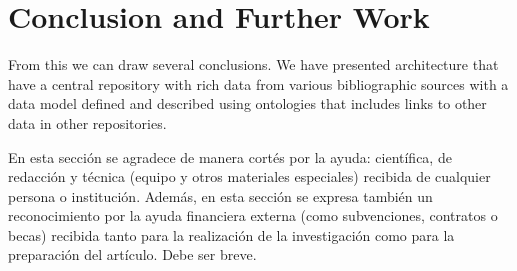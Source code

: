 \documentclass[11pt]{article}
\begin{document}
\section{Conclusion and Further Work}
\label{label:conlusionsfurtherwork}
From this we can draw several conclusions. We have presented architecture that have a central repository with rich data from various bibliographic sources with a data model defined and described using ontologies that includes links to other data in other repositories. 



\begin{acknowledgements} 
  En esta sección se agradece de manera cortés por la ayuda: científica, de redacción y 
técnica (equipo y otros materiales especiales) recibida de cualquier persona o institución. Además, en 
esta sección se expresa también un reconocimiento por la ayuda financiera externa (como 
subvenciones, contratos o becas) recibida tanto para la realización de la investigación como para la 
preparación del artículo. Debe ser breve.
\end{acknowledgements}





\end{document}
